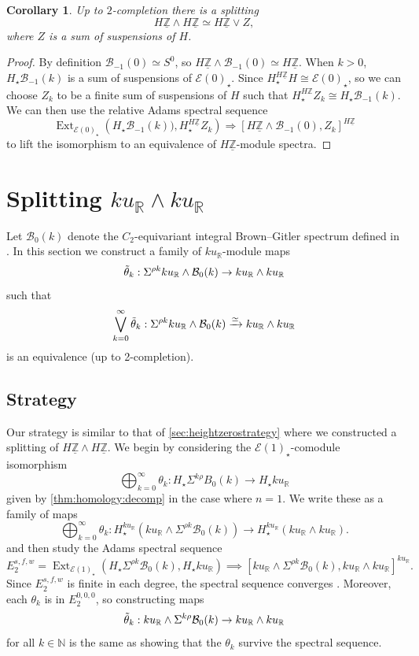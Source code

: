 \documentclass{amsart}
\newtheorem{cor}[equation]{Corollary}
\theoremstyle{plain}
\numberwithin{equation}{section}
\numberwithin{figure}{section}
\DeclareMathOperator{\Ext}{Ext}
\newcommand{\mN}{{\mathbb N}}
\newcommand{\mR}{{\mathbb R}}
\newcommand{\mZ}{{\mathbb Z}}
\newcommand{\cB}{{\mathcal B}}
\newcommand{\cE}{{\mathcal E}}
\newcommand{\umZ}{\underline{\mZ}}
\newcommand{\0}{\langle 0 \rangle }
\begin{document}
\begin{cor}\label{cor: height zero simples} Up to $2$-completion there is a splitting
    \[  H \umZ \wedge H \umZ \simeq H \umZ \vee Z,\]
where $Z$ is a sum of suspensions of $H$.
\end{cor}
\begin{proof}
    By definition $\cB_{-1}(0) \simeq S^{0}$, so $H \umZ \wedge \cB_{-1}(0) \simeq H \umZ$. When $k > 0$, $H_{\star}\cB_{-1}(k)$  is a sum of suspensions of $\cE(0)_{\star}$. Since $H_{\star}^{H\umZ}H\cong \cE(0)_{\star}$, so we can choose $Z_{k}$ to be a finite sum of suspensions of $H$ such that $H_{\star}^{H\mZ}Z_{k} \cong H_{\star}\cB_{-1}(k)$. We can then use the relative Adams spectral sequence \[
    \Ext_{\cE(0)_{\star}}\left(H_{\star}\cB_{-1}(k)),  H_\star^{H\umZ} Z_{k} \right) \Longrightarrow [H \umZ \wedge \cB_{-1}(0), Z_{k}]^{H\umZ} 
    \]  
    to lift the isomorphism to an equivalence of $H\umZ$-module spectra. 
    
\end{proof}

\section{Splitting {$ku_\mR \wedge ku_\mR$}}\label{sec:height1split} Let $\cB_0(k)$ denote the $C_2$-equivariant integral Brown--Gitler spectrum defined in \cite{LiPetersenTatum23}. In this section we construct a family of $ku_\mR$-module maps
\[
\Tilde{\theta}_k: \Sigma^{\rho k} ku_\mR \wedge \cB_0(k)\to ku_\mR \wedge ku_\mR
\]
such that 
\[
\bigvee_{k=0}^\infty \Tilde{\theta}_k: \Sigma^{\rho k} ku_\mR \wedge \cB_0(k) \xrightarrow{\simeq} ku_\mR \wedge ku_\mR
\]
is an equivalence (up to 2-completion). 

\subsection{Strategy}\label{sec:heightonestrategy} Our strategy is similar to that of \cref{sec:heightzerostrategy} where we constructed a splitting of $H \umZ \wedge H \umZ.$ We begin by considering the $\mathcal{E}(1)_\star$-comodule isomorphism
$$ \bigoplus_{k = 0}^\infty \theta_k : H_\star \Sigma^{k \rho} B_{0} (k) \to H_\star ku_\mR $$
given by \cref{thm:homology:decomp} in the case where $n = 1$. We write these as a family of maps
$$ \bigoplus_{k = 0}^\infty \theta_k : H_\star^{ku_\mR} \left(ku_\mR \wedge \Sigma^{\rho k} \cB_{0} (k)\right) \to H_\star^{ku_\mR} (ku_\mR \wedge ku_\mR).$$
and then study the
Adams spectral sequence
\begin{equation}\label{eq:AdamsSs}
     E_2^{s, f, w} = \Ext_{\mathcal{E}(1)_\star} \left(H_\star \Sigma^{\rho k} \cB_0(k), H_\star ku_\mR \right) \implies [ku_\mR \wedge \Sigma^{\rho k} \cB_{0} (k),ku_\mR \wedge ku_\mR]^{ku_\mR}.
\end{equation} 
Since $E_{2}^{s,f,w}$ is finite in each degree, the spectral sequence converges \cite[Thm~15.6, Thm~7.1]{boardman1999conditionally}. Moreover, each $\theta_k$ is in $E_2^{0,0,0}$, so constructing maps 
\[
\Tilde{\theta}_k : ku_\mR \wedge \Sigma^{k \rho} \cB_{0} (k)\to ku_\mR \wedge ku_\mR
\]
for all $k \in \mN$ is the same as showing that the $\theta_k$ survive the spectral sequence.
\end{document}
